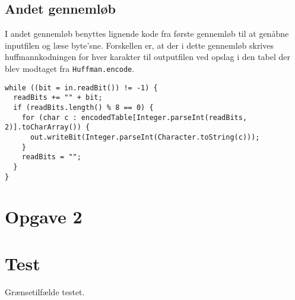 \documentclass{article}
\begin{document}
\subsection*{Andet gennemløb}

I andet gennemløb benyttes lignende kode fra første gennemløb til at genåbne inputfilen og læse byte'sne. Forskellen er, at der i dette gennemløb skrives huffmannkodningen for hver karakter til outputfilen ved opslag i den tabel der blev modtaget fra \texttt{Huffman.encode}.

\begin{lstlisting}
while ((bit = in.readBit()) != -1) {
  readBits += "" + bit;
  if (readBits.length() % 8 == 0) {
    for (char c : encodedTable[Integer.parseInt(readBits, 2)].toCharArray()) {
      out.writeBit(Integer.parseInt(Character.toString(c)));
    }
    readBits = "";
  }
}
\end{lstlisting}


\newpage

\section*{Opgave 2}

\newpage

\section*{Test}

Grænsetilfælde testet.
\end{document}
